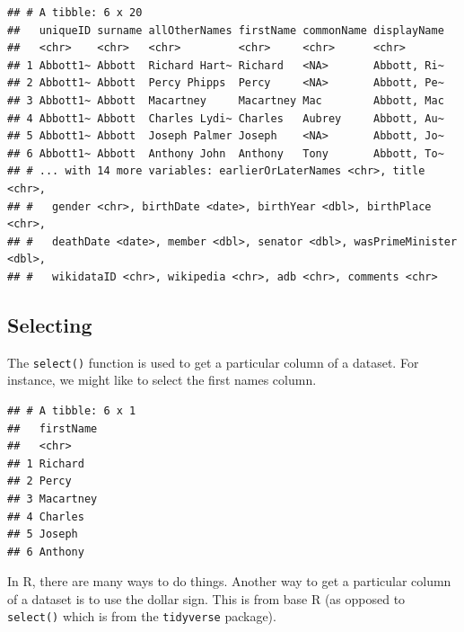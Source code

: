 \documentclass[
]{book}
\newenvironment{Shaded}{\begin{snugshade}}{\end{snugshade}}
\newcommand{\KeywordTok}[1]{\textcolor[rgb]{0.13,0.29,0.53}{\textbf{#1}}}
\newcommand{\NormalTok}[1]{#1}
\newcommand{\OperatorTok}[1]{\textcolor[rgb]{0.81,0.36,0.00}{\textbf{#1}}}
\newcommand{\StringTok}[1]{\textcolor[rgb]{0.31,0.60,0.02}{#1}}
\begin{document}
\begin{verbatim}
## # A tibble: 6 x 20
##   uniqueID surname allOtherNames firstName commonName displayName
##   <chr>    <chr>   <chr>         <chr>     <chr>      <chr>      
## 1 Abbott1~ Abbott  Richard Hart~ Richard   <NA>       Abbott, Ri~
## 2 Abbott1~ Abbott  Percy Phipps  Percy     <NA>       Abbott, Pe~
## 3 Abbott1~ Abbott  Macartney     Macartney Mac        Abbott, Mac
## 4 Abbott1~ Abbott  Charles Lydi~ Charles   Aubrey     Abbott, Au~
## 5 Abbott1~ Abbott  Joseph Palmer Joseph    <NA>       Abbott, Jo~
## 6 Abbott1~ Abbott  Anthony John  Anthony   Tony       Abbott, To~
## # ... with 14 more variables: earlierOrLaterNames <chr>, title <chr>,
## #   gender <chr>, birthDate <date>, birthYear <dbl>, birthPlace <chr>,
## #   deathDate <date>, member <dbl>, senator <dbl>, wasPrimeMinister <dbl>,
## #   wikidataID <chr>, wikipedia <chr>, adb <chr>, comments <chr>
\end{verbatim}

\hypertarget{selecting}{%
\subsection{Selecting}\label{selecting}}

The \texttt{select()} function is used to get a particular column of a dataset. For instance, we might like to select the first names column.

\begin{Shaded}
\end{Shaded}

\begin{verbatim}
## # A tibble: 6 x 1
##   firstName
##   <chr>    
## 1 Richard  
## 2 Percy    
## 3 Macartney
## 4 Charles  
## 5 Joseph   
## 6 Anthony
\end{verbatim}

In R, there are many ways to do things. Another way to get a particular column of a dataset is to use the dollar sign. This is from base R (as opposed to \texttt{select()} which is from the \texttt{tidyverse} package).

\begin{Shaded}
\end{Shaded}
\end{document}
